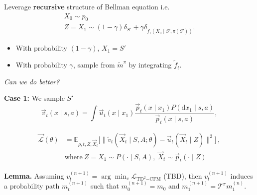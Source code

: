 \documentclass{beamer}
\begin{document}
    \begin{frame}
    \begin{blackblock}
    Leverage \textbf{recursive} structure of Bellman equation i.e.
    \begin{gather*}
        X_{0} \sim p_{0} \\
        Z = X_1 \sim (1 - \gamma)\delta_{S'} + \gamma \delta_{\tilde{f}_1(X_0 \mid S', \pi(S'))}
    .\end{gather*}
    \end{blackblock}
    \begin{itemize}
        \item With probability \( (1 - \gamma) \), \( X_{1} = S' \)
        \item With probability \( \gamma \), sample from \( \tilde{m}^{\pi} \) by integrating \( \tilde{f}_t \).
    \end{itemize}
    \vspace*{1cm}
        \begin{center}
            \emph{Can we do better?}
        \end{center}
    \end{frame}
    \begin{frame}
        \textbf{Case 1:} We sample \( S' \)
\[ \vec{v}_t(x \mid s, a) = \int \vec{u}_{t}(x \mid x_1) \frac{\vec{p}_{t}(x \mid x_1) P(\mathrm{d}x_1 \mid s, a)}{\vec{p}_t(x \mid s, a)}, \]
\begin{blackblock}
\[ \begin{aligned} \vec{\mathcal{L}}(\theta) &= \mathbb{E}_{\rho,t,Z,\vec{X}_t}\Big[\big\|\tilde{v}_t(\vec{X}_t\mid S, A; \theta) - \vec{u}_{t}(\vec{X}_t\mid Z)\big\|^2\Big]\,,\\ &\text{where}\ Z = X_1 \sim P(\cdot\mid S, A),\ \vec{X}_t \sim \vec{p}_{t}(\cdot\mid Z)\, \end{aligned} \]
\end{blackblock}
    \end{frame}
    \begin{frame}
        \textbf{Lemma.}
        Assuming $v_t^{(n+1)} = \arg\min_{v} \mathcal{L}_{\mathrm{TD}^2\mathrm{-CFM}}$ (TBD), then \( v_t^{(n + 1)} \) induces a probability path $m_t^{(n+1)}$ such that $m_0^{(n+1)} = m_0$ and $m_1^{(n+1)} = \mathcal{T}^{\pi} m_1^{(n)}$. \\
\vskip 5pt
\vspace*{.25cm}
    \end{frame}
\end{document}
